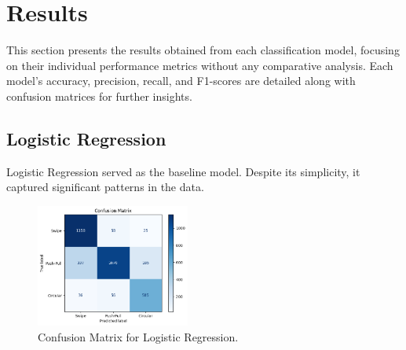 \documentclass[10pt,twocolumn,letterpaper]{article}
\begin{document}
\cite{haseeb2020wisture, abdelnasser2015wifi, wang2017wifi}


\section{Results}

This section presents the results obtained from each classification model, focusing on their individual performance metrics without any comparative analysis. Each model's accuracy, precision, recall, and F1-scores are detailed along with confusion matrices for further insights.

\subsection{Logistic Regression}

Logistic Regression served as the baseline model. Despite its simplicity, it captured significant patterns in the data.

\begin{table}[h]
\small
\begin{center}
\caption{Performance Metrics for Logistic Regression}
\vspace{0.1cm}
\end{center}
\end{table}

\begin{figure}[h]
  \centering
  \includegraphics[width=0.45\textwidth]{figures/confusion_matrix_lr.png}
  \caption{Confusion Matrix for Logistic Regression.}
  \label{fig:confusion_matrix_lr}
\end{figure}
\end{document}

